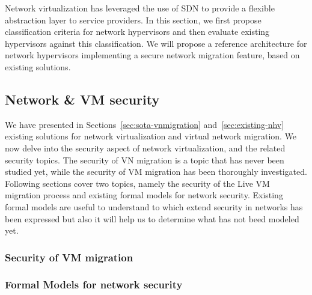 \documentclass[a4paper, 11pt]{article}
\begin{document}
Network virtualization has leveraged the use of SDN to provide a flexible abstraction layer to service providers. In this section, we first propose classification criteria for network hypervisors and then evaluate existing hypervisors against this classification. We will propose a reference architecture for network hypervisors implementing a secure network migration feature, based on existing solutions.















\newpage
\subsection{Network \& VM security}

We have presented in Sections~\ref{sec:sota-vnmigration} and~\ref{sec:existing-nhv} existing solutions for network virtualization and virtual network migration. We now delve into the security aspect of network virtualization, and the related security topics. The security of VN migration is a topic that has never been  studied yet, while the security of VM migration has been thoroughly investigated. Following sections cover two topics, namely the security of the Live VM migration process and existing formal models for network security.
Existing formal models are useful to understand to which extend security in networks has been expressed but also it will help us to determine what has not beed modeled yet.

\subsubsection{Security of VM migration}



\subsubsection{Formal Models for network security}
\end{document}
